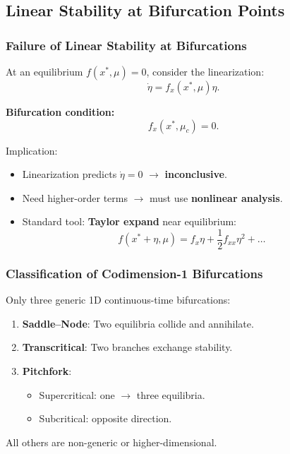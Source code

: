 \documentclass{beamer}
\begin{document}

\subsection{Linear Stability at Bifurcation Points}

\begin{frame}
\frametitle{Failure of Linear Stability at Bifurcations}

At an equilibrium \(f(x^\ast,\mu)=0\), consider the linearization:
\[
\dot \eta = f_x(x^\ast,\mu)\eta.
\]

\textbf{Bifurcation condition:}
\[
f_x(x^\ast,\mu_c) = 0.
\]

Implication:
\begin{itemize}
    \item Linearization predicts \(\dot \eta = 0\) $\to$ \textbf{inconclusive}.
    \item Need higher-order terms $\to$ must use \textbf{nonlinear analysis}.
    \item Standard tool: \textbf{Taylor expand} near equilibrium:
    \[
    f(x^\ast+\eta,\mu) =
    f_x \eta + \frac{1}{2}f_{xx}\eta^2 + \dots
    \]
\end{itemize}

\end{frame}


\begin{frame}
\frametitle{Classification of Codimension-1 Bifurcations}

Only three generic 1D continuous-time bifurcations:

\begin{enumerate}
    \item \textbf{Saddle--Node}: Two equilibria collide and annihilate.
    \item \textbf{Transcritical}: Two branches exchange stability.
    \item \textbf{Pitchfork}:
    \begin{itemize}
        \item Supercritical: one $\to$ three equilibria.
        \item Subcritical: opposite direction.
    \end{itemize}
\end{enumerate}

All others are non-generic or higher-dimensional.

\end{frame}
\end{document}
